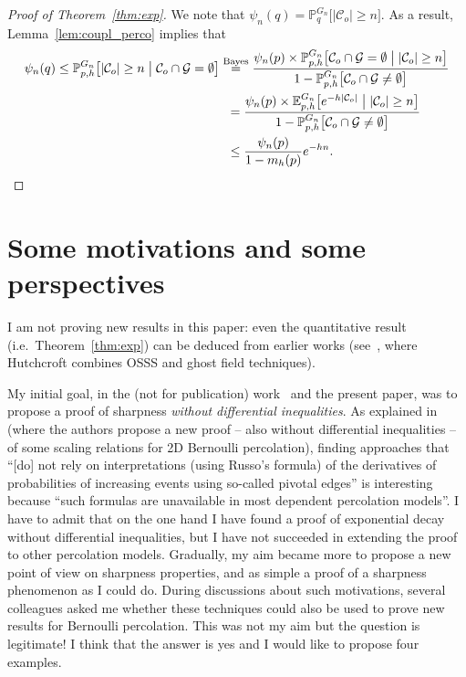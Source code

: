 \documentclass[AHL,Unicode,longabstracts,published]{cedram}
\newcommand{\E}{\mathbb{E}}
\newcommand{\Pro}{\mathbb{P}}
\newcommand{\calC}{\mathcal{C}}
\newcommand{\calG}{\mathcal{G}}
\begin{document}
\begin{proof}[Proof of Theorem~\ref{thm:exp}]
We note that $\psi_n(q)=\Pro_q^{G_n} \big[|\calC_o|\ge n \big]$. As a result, Lemma~\ref{lem:coupl_perco} implies that
\begin{align*}
\psi_n(q)\le\Pro_{p,h}^{G_n} \big[|\calC_o|\ge n \; \big| \; \calC_o \cap \calG = \emptyset
\big] &\overset{\text{Bayes}}{=} \frac{\psi_n(p) \times \Pro_{p,h}^{G_n}\big[\calC_o \cap \calG = \emptyset \; \big| \; |\calC_o| \ge n \big]}{1-\Pro_{p,h}^{G_n}\big[\calC_o \cap \calG \neq \emptyset \big]}\\
& \hspace{0.2cm}= \frac{\psi_n(p) \times \E_{p,h}^{G_n}\big[e^{-h|\calC_o|} \; \big| \; |\calC_o| \ge n \big]}{1-\Pro_{p,h}^{G_n}\big[\calC_o \cap \calG \neq \emptyset \big]}\\
& \hspace{0.2cm}\le \frac{\psi_n(p)}{1-m_h(p)} e^{-hn}. \qedhere
\end{align*}
\end{proof}

\section{Some motivations and some perspectives}\label{sec:motiv}

I am not proving new results in this paper: even the quantitative result (i.e.\ Theorem~\ref{thm:exp}) can be deduced from earlier works (see~\cite{Hut20}, where Hutchcroft combines OSSS and ghost field techniques).

My initial goal, in the (not for publication) work~\cite{Van22} and the present paper, was to propose a proof of sharpness \emph{without differential inequalities}. As explained in~\cite{DMT21'} (where the authors propose a new proof -- also without differential inequalities -- of some scaling relations for 2D Bernoulli percolation), finding approaches that ``[do] not rely on interpretations (using Russo’s formula) of the derivatives of probabilities of increasing events using so-called pivotal edges'' is interesting because ``such formulas are unavailable in most dependent percolation models''. I have to admit that on the one hand I have found a proof of exponential decay without differential inequalities, but I have not succeeded in extending the proof to other percolation models. Gradually, my aim became more to propose a new point of view on sharpness properties, and as simple a proof of a sharpness phenomenon as I could do. During discussions about such motivations, several colleagues asked me whether these techniques could also be used to prove new results for Bernoulli percolation. This was not my aim but the question is legitimate! I think that the answer is yes and I would like to propose four examples.
\end{document}
